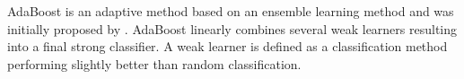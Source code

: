 \begin{enumerate}[leftmargin=*]
AdaBoost is an adaptive method based on an ensemble learning method and was initially proposed by \cite{Freund1997}. AdaBoost linearly combines several weak learners resulting into a final strong classifier. A weak learner is defined as a classification method performing slightly better than random classification. %
%
%
%
%
%
%
%
%

\end{enumerate}
